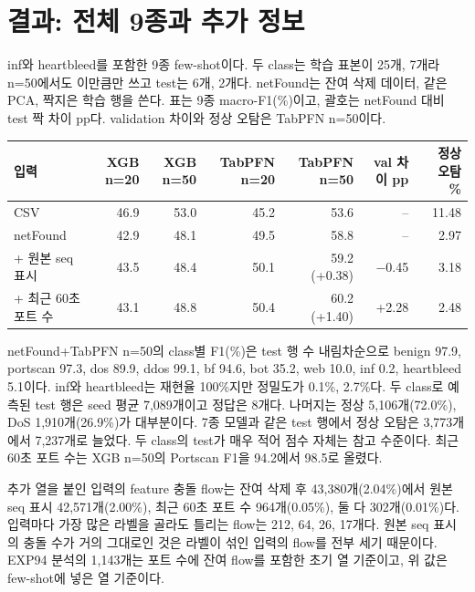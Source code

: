 \section{결과: 전체 9종과 추가 정보}
inf와 heartbleed를 포함한 9종 few-shot이다. 두 class는 학습 표본이 25개, 7개라 n=50에서도 이만큼만 쓰고 test는 6개, 2개다. netFound는 잔여 삭제 데이터, 같은 PCA, 짝지은 학습 행을 쓴다. 표는 9종 macro-F1(\%)이고, 괄호는 netFound 대비 test 짝 차이 pp다. validation 차이와 정상 오탐은 TabPFN n=50이다.
\begin{center}\small
\begin{tabular}{lrrrrrr}
\toprule
입력 & XGB n=20 & XGB n=50 & TabPFN n=20 & TabPFN n=50 & val 차이 pp & 정상 오탐 \%\\\midrule
CSV & 46.9 & 53.0 & 45.2 & 53.6 & -- & 11.48\\
netFound & 42.9 & 48.1 & 49.5 & 58.8 & -- & 2.97\\
+ 원본 seq 표시 & 43.5 & 48.4 & 50.1 & 59.2 (+0.38) & $-$0.45 & 3.18\\
+ 최근 60초 포트 수 & 43.1 & 48.8 & 50.4 & 60.2 (+1.40) & +2.28 & 2.48\\
\bottomrule
\end{tabular}
\end{center}
netFound+TabPFN n=50의 class별 F1(\%)은 test 행 수 내림차순으로 benign 97.9, portscan 97.3, dos 89.9, ddos 99.1, bf 94.6, bot 35.2, web 10.0, inf 0.2, heartbleed 5.1이다. inf와 heartbleed는 재현율 100\%지만 정밀도가 0.1\%, 2.7\%다. 두 class로 예측된 test 행은 seed 평균 7,089개이고 정답은 8개다. 나머지는 정상 5,106개(72.0\%), DoS 1,910개(26.9\%)가 대부분이다. 7종 모델과 같은 test 행에서 정상 오탐은 3,773개에서 7,237개로 늘었다. 두 class의 test가 매우 적어 점수 자체는 참고 수준이다. 최근 60초 포트 수는 XGB n=50의 Portscan F1을 94.2에서 98.5로 올렸다.

추가 열을 붙인 입력의 feature 충돌 flow는 잔여 삭제 후 43,380개(2.04\%)에서 원본 seq 표시 42,571개(2.00\%), 최근 60초 포트 수 964개(0.05\%), 둘 다 302개(0.01\%)다. 입력마다 가장 많은 라벨을 골라도 틀리는 flow는 212, 64, 26, 17개다. 원본 seq 표시의 충돌 수가 거의 그대로인 것은 라벨이 섞인 입력의 flow를 전부 세기 때문이다. EXP94 분석의 1,143개는 포트 수에 잔여 flow를 포함한 초기 열 기준이고, 위 값은 few-shot에 넣은 열 기준이다.

